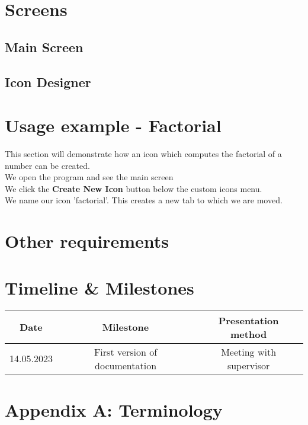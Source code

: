 \documentclass{article}
\begin{document}
    \section{Screens}
        \subsection{Main Screen}
        \subsection{Icon Designer}

    \section{Usage example - Factorial}
        This section will demonstrate how an icon which computes the factorial of a number can be created.\\

        We open the program and see the main screen\\

        We click the \textbf{Create New Icon} button below the custom icons menu.\\

        We name our icon 'factorial'. This creates a new tab to which we are moved. \\



    \section{Other requirements}


    \section{Timeline \& Milestones}
        \begin{tabular}{ | c | c | c | }
            \hline
            Date & Milestone & Presentation method\\
            \hline

            14.05.2023 & First version of documentation & Meeting with supervisor \\


            \hline

        \end{tabular}


    \section*{Appendix A: Terminology}
\end{document}
